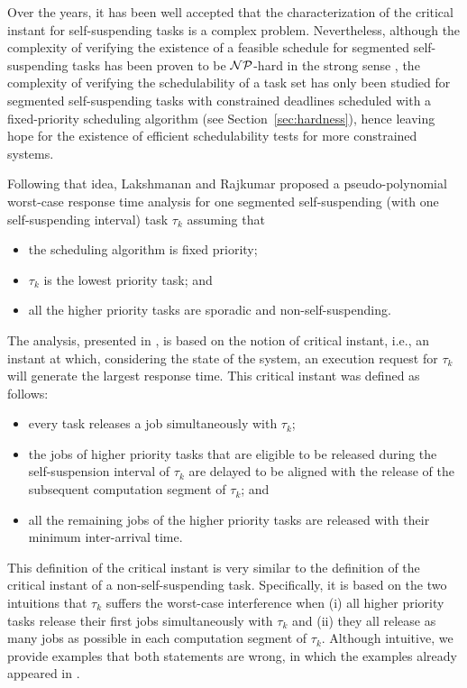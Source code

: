 Over the years, it has been well accepted that the characterization of the critical instant for self-suspending tasks is a complex problem. Nevertheless, although the complexity of verifying the existence of a feasible schedule for segmented self-suspending tasks has been proven to be ${\cal NP}$-hard in the strong sense \cite{Ridouard_2004}, the complexity of verifying the schedulability of a task set has only been studied for segmented self-suspending tasks with constrained deadlines scheduled with a fixed-priority scheduling algorithm (see Section~\ref{sec:hardness}), hence leaving hope for the existence of efficient schedulability tests for more constrained systems. 

Following that idea, Lakshmanan and Rajkumar \cite{LR:rtas10} proposed a pseudo-polynomial worst-case response time analysis for one segmented self-suspending (with one self-suspending interval) task $\tau_k$ assuming that 
\begin{itemize}
\item the scheduling algorithm is fixed priority;
\item $\tau_k$ is the lowest priority task;  and
\item all the higher priority tasks are sporadic and non-self-suspending.
\end{itemize}
The analysis, presented in \cite{LR:rtas10}, is based on the notion of critical instant, i.e., an instant at which, considering the state of the system, an execution request for $\tau_k$ will generate the largest response time. This critical instant was defined as follows:
\begin{itemize}
	\item every task releases a job simultaneously with $\tau_k$;
	\item the jobs of higher priority tasks that are eligible to be released during the self-suspension interval of $\tau_k$ are delayed to be aligned with the release of the subsequent computation segment of $\tau_k$; and
	\item all the remaining jobs of the higher priority tasks are released with their minimum inter-arrival time.
\end{itemize}

This definition of the critical instant is very similar to the definition of the critical instant of a non-self-suspending task. Specifically, it is based on the two intuitions that $\tau_k$ suffers the worst-case interference when (i) all higher priority tasks release their first jobs simultaneously with $\tau_k$ and (ii) they all release as many jobs as possible in each computation segment of $\tau_k$. Although intuitive, we provide examples that both statements are wrong, in which the examples already appeared in \cite{ecrts15nelissen}.

